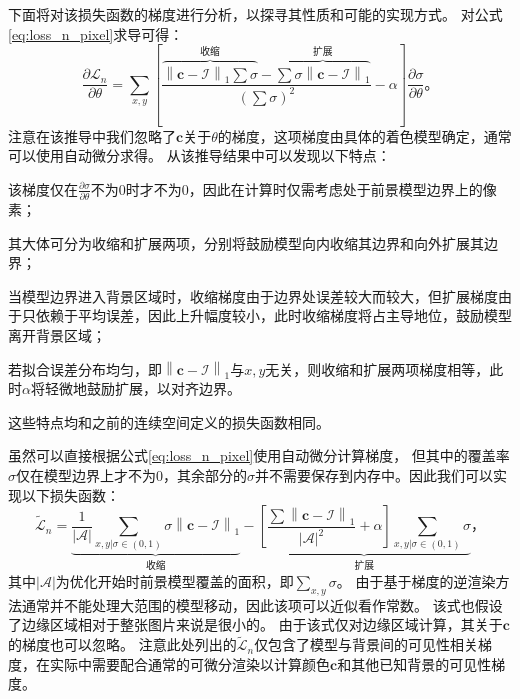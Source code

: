 下面将对该损失函数的梯度进行分析，以探寻其性质和可能的实现方式。
对公式\ref{eq:loss_n_pixel}求导可得：
\begin{equation}
\frac{\partial\mathcal{L}_n}{\partial\theta} =
\sum_{x,y}\left[
    \frac{
        \overbrace{\left\| \mathbf{c} - \mathcal{I} \right\|_1 \sum\sigma}^\text{收缩} -
        \overbrace{\sum \sigma \left\| \mathbf{c} - \mathcal{I} \right\|_1}^\text{扩展}
    }{\displaystyle\left(\sum\sigma\right)^2} - \alpha
\right]\frac{\partial\sigma}{\partial\theta}
\text{。}
\end{equation}
注意在该推导中我们忽略了$\mathbf{c}$关于$\theta$的梯度，这项梯度由具体的着色模型确定，通常可以使用自动微分求得。
从该推导结果中可以发现以下特点：
\begin{enumerate*}
    \item 该梯度仅在$\frac{\partial\sigma}{\partial\theta}$不为0时才不为0，因此在计算时仅需考虑处于前景模型边界上的像素；
    \item 其大体可分为收缩和扩展两项，分别将鼓励模型向内收缩其边界和向外扩展其边界；
    \item 当模型边界进入背景区域时，收缩梯度由于边界处误差较大而较大，但扩展梯度由于只依赖于平均误差，因此上升幅度较小，此时收缩梯度将占主导地位，鼓励模型离开背景区域；
    \item 若拟合误差分布均匀，即$\left\|\mathbf{c} - \mathcal{I}\right\|_1$与$x,y$无关，则收缩和扩展两项梯度相等，此时$\alpha$将轻微地鼓励扩展，以对齐边界。
\end{enumerate*}
这些特点均和之前的连续空间定义的损失函数相同。

虽然可以直接根据公式\ref{eq:loss_n_pixel}使用自动微分计算梯度，
但其中的覆盖率$\sigma$仅在模型边界上才不为0，其余部分的$\sigma$并不需要保存到内存中。因此我们可以实现以下损失函数：
\begin{equation}
\tilde{\mathcal{L}}_n =
\underbrace{\frac{1}{|\mathcal{A}|}\sum_{x,y|\sigma\in(0,1)} \sigma\left\| \mathbf{c} - \mathcal{I} \right\|_1}_{\text{收缩}} -
\underbrace{\left[\frac{\sum\left\| \mathbf{c} - \mathcal{I} \right\|_1}{|\mathcal{A}|^2}+\alpha\right]\sum_{x,y|\sigma\in(0,1)} \sigma}_{\text{扩展}}
\text{，}
\label{eq:loss_n_tilde}
\end{equation}
其中$|\mathcal{A}|$为优化开始时前景模型覆盖的面积，即$\sum_{x,y} \sigma$。
由于基于梯度的逆渲染方法通常并不能处理大范围的模型移动，因此该项可以近似看作常数。
该式也假设了边缘区域相对于整张图片来说是很小的。
由于该式仅对边缘区域计算，其关于$\mathbf{c}$的梯度也可以忽略。
注意此处列出的$\tilde{\mathcal{L}}_n$仅包含了模型与背景间的可见性相关梯度，在实际中需要配合通常的可微分渲染以计算颜色$\mathbf{c}$和其他已知背景的可见性梯度。

